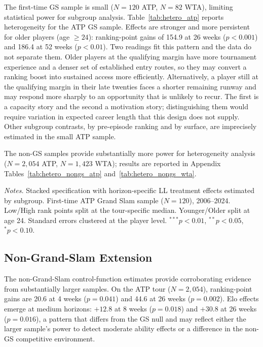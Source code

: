 The first-time GS sample is small ($N = 120$ ATP, $N = 82$ WTA), limiting statistical power for subgroup analysis. Table~\ref{tab:hetero_atp} reports heterogeneity for the ATP GS sample. Effects are stronger and more persistent for older players (age $\geq 24$): ranking-point gains of 154.9 at 26 weeks ($p < 0.001$) and 186.4 at 52 weeks ($p < 0.01$). Two readings fit this pattern and the data do not separate them. Older players at the qualifying margin have more tournament experience and a denser set of established entry routes, so they may convert a ranking boost into sustained access more efficiently. Alternatively, a player still at the qualifying margin in their late twenties faces a shorter remaining runway and may respond more sharply to an opportunity that is unlikely to recur. The first is a capacity story and the second a motivation story; distinguishing them would require variation in expected career length that this design does not supply. Other subgroup contrasts, by pre-episode ranking and by surface, are imprecisely estimated in the small ATP sample.

The non-GS samples provide substantially more power for heterogeneity analysis ($N = 2{,}054$ ATP, $N = 1{,}423$ WTA); results are reported in Appendix Tables~\ref{tab:hetero_nongs_atp} and~\ref{tab:hetero_nongs_wta}.

\begin{table}[htbp]
\centering
\caption{ATP Grand Slam: Heterogeneous Effects}
\label{tab:hetero_atp}
\begin{threeparttable}
\small

\begin{tablenotes}
\footnotesize
\item \textit{Notes.} Stacked specification with horizon-specific LL treatment effects estimated by subgroup. First-time ATP Grand Slam sample ($N = 120$), 2006--2024. Low/High rank points split at the tour-specific median. Younger/Older split at age 24. Standard errors clustered at the player level. $^{***}p<0.01$, $^{**}p<0.05$, $^{*}p<0.10$.
\end{tablenotes}
\end{threeparttable}
\end{table}

\subsection{Non-Grand-Slam Extension}
\label{sec:results_nongs}

The non-Grand-Slam control-function estimates provide corroborating evidence from substantially larger samples. On the ATP tour ($N = 2{,}054$), ranking-point gains are 20.6 at 4 weeks ($p = 0.041$) and 44.6 at 26 weeks ($p = 0.002$). Elo effects emerge at medium horizons: $+12.8$ at 8 weeks ($p = 0.018$) and $+30.8$ at 26 weeks ($p = 0.016$), a pattern that differs from the GS null and may reflect either the larger sample's power to detect moderate ability effects or a difference in the non-GS competitive environment.

